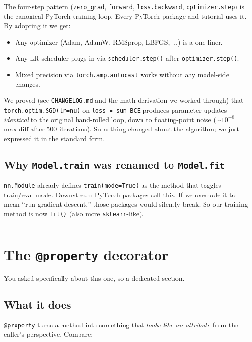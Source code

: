 \documentclass[11pt]{article}
\begin{document}
The four-step pattern (\texttt{zero\_grad}, \texttt{forward}, \texttt{loss.backward}, \texttt{optimizer.step}) is the canonical PyTorch training loop. Every PyTorch package and tutorial uses it. By adopting it we get:

\begin{itemize}[leftmargin=*, itemsep=2pt]
  \item Any optimizer (Adam, AdamW, RMSprop, LBFGS, $\ldots$) is a one-liner.
  \item Any LR scheduler plugs in via \texttt{scheduler.step()} after \texttt{optimizer.step()}.
  \item Mixed precision via \texttt{torch.amp.autocast} works without any model-side changes.
\end{itemize}

We proved (see \texttt{CHANGELOG.md} and the math derivation we worked
through) that \texttt{torch.optim.SGD(lr=nu)} on \texttt{loss = sum BCE}
produces parameter updates \emph{identical} to the original hand-rolled loop,
down to floating-point noise ($\sim 10^{-8}$ max diff after 500 iterations).
So nothing changed about the algorithm; we just expressed it in the standard
form.

\subsection{Why \texttt{Model.train} was renamed to \texttt{Model.fit}}

\texttt{nn.Module} already defines \texttt{train(mode=True)} as the method
that toggles train/eval mode. Downstream PyTorch packages call this. If we
overrode it to mean ``run gradient descent,'' those packages would silently
break. So our training method is now \texttt{fit()} (also more
\texttt{sklearn}-like).

\bigskip
\hrule
\bigskip

\section{The \texttt{@property} decorator}
\label{sec:property}

You asked specifically about this one, so a dedicated section.

\subsection{What it does}

\texttt{@property} turns a method into something that \emph{looks like an
attribute} from the caller's perspective. Compare:
\end{document}
